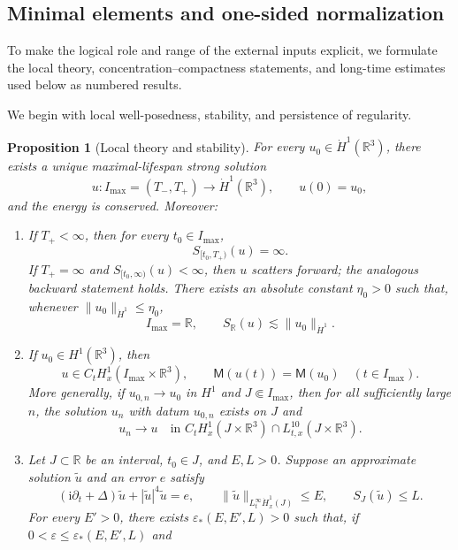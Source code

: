 \documentclass{interact}
\numberwithin{equation}{section}
\theoremstyle{plain}
\newtheorem{proposition}[theorem]{Proposition}
\theoremstyle{definition}
\theoremstyle{remark}
\newcommand{\R}{\mathbb R}
\newcommand{\ii}{\mathrm i}
\newcommand{\M}{\mathsf M}
\begin{document}
\subsection{Minimal elements and one-sided normalization}

To make the logical role and range of the external inputs explicit, we formulate the local theory, concentration--compactness statements, and long-time estimates used below as numbered results.

We begin with local well-posedness, stability, and persistence of regularity.

\begin{proposition}[Local theory and stability]\label{prop:local-theory}
For every $u_0\in\dot H^1(\R^3)$, there exists a unique maximal-lifespan strong solution
\[
 u:I_{\max}=(T_-,T_+)\longrightarrow\dot H^1(\R^3),
 \qquad u(0)=u_0,
\]
and the energy is conserved. Moreover:
\begin{enumerate}[label=\textup{(\roman*)},leftmargin=2.4em]
 \item If $T_+<\infty$, then for every $t_0\in I_{\max}$,
 \[
  S_{[t_0,T_+)}(u)=\infty.
 \]
 If $T_+=\infty$ and $S_{[t_0,\infty)}(u)<\infty$, then $u$ scatters forward; the analogous backward statement holds. There exists an absolute constant $\eta_0>0$ such that, whenever $\|u_0\|_{\dot H^1}\le\eta_0$,
 \[
  I_{\max}=\R,
  \qquad S_{\R}(u)\lesssim\|u_0\|_{\dot H^1}.
 \]
 \item If $u_0\in H^1(\R^3)$, then
 \begin{equation}\label{eq:H1-persistence-local-theory}
  u\in C_tH_x^1(I_{\max}\times\R^3),
  \qquad
  \M(u(t))=\M(u_0)\quad(t\in I_{\max}).
 \end{equation}
 More generally, if $u_{0,n}\to u_0$ in $H^1$ and $J\Subset I_{\max}$, then for all sufficiently large $n$, the solution $u_n$ with datum $u_{0,n}$ exists on $J$ and
 \begin{equation}\label{eq:H1-continuous-dependence}
  u_n\longrightarrow u
  \quad\text{in }C_tH_x^1(J\times\R^3)
  \cap L_{t,x}^{10}(J\times\R^3).
 \end{equation}
 \item Let $J\subset\R$ be an interval, $t_0\in J$, and $E,L>0$. Suppose an approximate solution $\widetilde u$ and an error $e$ satisfy
 \[
  (\ii\partial_t+\Delta)\widetilde u+|\widetilde u|^4\widetilde u=e,
  \qquad
  \|\widetilde u\|_{L_t^\infty\dot H_x^1(J)}\le E,
  \qquad
  S_J(\widetilde u)\le L.
 \]
 For every $E'>0$, there exists $\varepsilon_*(E,E',L)>0$ such that, if $0<\varepsilon\le\varepsilon_*(E,E',L)$ and

\end{enumerate}
\end{proposition}
\end{document}
